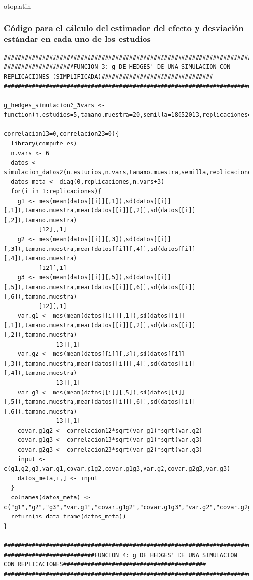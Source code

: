 otoplatin\documentclass[a4paper,openright,12pt]{report}
\begin{document}
\subsubsection{Código para el cálculo del estimador del efecto y desviación estándar en cada uno de los estudios}
{\tiny
\begin{verbatim}
##############################################################################################################################
####################FUNCION 3: g DE HEDGES' DE UNA SIMULACION CON REPLICACIONES (SIMPLIFICADA)################################
##############################################################################################################################

g_hedges_simulacion2_3vars <- function(n.estudios=5,tamano.muestra=20,semilla=18052013,replicaciones=5,correlacion12=0,
                                       correlacion13=0,correlacion23=0){
  library(compute.es)
  n.vars <- 6
  datos <- simulacion_datos2(n.estudios,n.vars,tamano.muestra,semilla,replicaciones) 
  datos_meta <- diag(0,replicaciones,n.vars+3)
  for(i in 1:replicaciones){
    g1 <- mes(mean(datos[[i]][,1]),sd(datos[[i]][,1]),tamano.muestra,mean(datos[[i]][,2]),sd(datos[[i]][,2]),tamano.muestra)
          [12][,1]
    g2 <- mes(mean(datos[[i]][,3]),sd(datos[[i]][,3]),tamano.muestra,mean(datos[[i]][,4]),sd(datos[[i]][,4]),tamano.muestra) 
          [12][,1]
    g3 <- mes(mean(datos[[i]][,5]),sd(datos[[i]][,5]),tamano.muestra,mean(datos[[i]][,6]),sd(datos[[i]][,6]),tamano.muestra)
          [12][,1]
    var.g1 <- mes(mean(datos[[i]][,1]),sd(datos[[i]][,1]),tamano.muestra,mean(datos[[i]][,2]),sd(datos[[i]][,2]),tamano.muestra)
              [13][,1]
    var.g2 <- mes(mean(datos[[i]][,3]),sd(datos[[i]][,3]),tamano.muestra,mean(datos[[i]][,4]),sd(datos[[i]][,4]),tamano.muestra)
              [13][,1]
    var.g3 <- mes(mean(datos[[i]][,5]),sd(datos[[i]][,5]),tamano.muestra,mean(datos[[i]][,6]),sd(datos[[i]][,6]),tamano.muestra)
              [13][,1]
    covar.g1g2 <- correlacion12*sqrt(var.g1)*sqrt(var.g2)
    covar.g1g3 <- correlacion13*sqrt(var.g1)*sqrt(var.g3)
    covar.g2g3 <- correlacion23*sqrt(var.g2)*sqrt(var.g3)
    input <- c(g1,g2,g3,var.g1,covar.g1g2,covar.g1g3,var.g2,covar.g2g3,var.g3)
    datos_meta[i,] <- input
  }
  colnames(datos_meta) <- c("g1","g2","g3","var.g1","covar.g1g2","covar.g1g3","var.g2","covar.g2g3","var.g3")
  return(as.data.frame(datos_meta))
}

##############################################################################################################################
##########################FUNCION 4: g DE HEDGES' DE UNA SIMULACION CON REPLICACIONES#########################################
##############################################################################################################################


\end{verbatim}}
\end{document}
